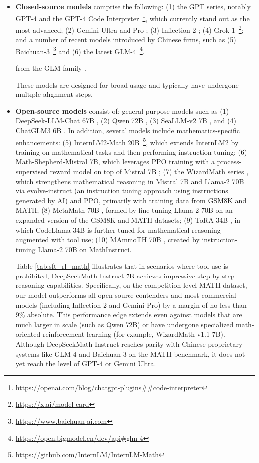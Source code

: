 \begin{itemize}[topsep=0pt]
\begin{itemize}[topsep=0pt]
    \item \textbf{Closed-source models} comprise the following: (1) the GPT series, notably GPT-4 \citep{gpt4} and the GPT-4 Code Interpreter~\footnote{\url{https://openai.com/blog/chatgpt-plugins\#\#code-interpreter}}, which currently stand out as the most advanced; (2) Gemini Ultra and Pro \citep{gemini}; (3) Inflection-2 \citep{inflection-2}; (4) Grok-1~\footnote{\url{https://x.ai/model-card}}; and a number of recent models introduced by Chinese firms, such as (5) Baichuan-3~\footnote{\url{https://www.baichuan-ai.com}} and (6) the latest GLM-4~\footnote{\url{https://open.bigmodel.cn/dev/api\#glm-4}}.

    from the GLM family \citep{glm}.

These models are designed for broad usage and typically have undergone multiple alignment steps.  
\item \textbf{Open-source models} consist of: general-purpose models such as (1) DeepSeek-LLM-Chat 67B \citep{deepseek-llm}, (2) Qwen 72B \citep{qwen}, (3) SeaLLM-v2 7B \citep{seallm}, and (4) ChatGLM3 6B \citep{chatglm3}. In addition, several models include mathematics-specific enhancements: (5) InternLM2-Math 20B~\footnote{\url{https://github.com/InternLM/InternLM-Math}}, which extends InternLM2 by training on mathematical tasks and then performing instruction tuning; (6) Math-Shepherd-Mistral 7B, which leverages PPO training \citep{schulman2017proximal} with a process-supervised reward model on top of Mistral 7B \citep{mistral}; (7) the WizardMath series \citep{wizardmath}, which strengthens mathematical reasoning in Mistral 7B and Llama-2 70B \citep{llama2} via evolve-instruct (an instruction tuning approach using instructions generated by AI) and PPO, primarily with training data from GSM8K and MATH; (8) MetaMath 70B \citep{metamath}, formed by fine-tuning Llama-2 70B on an expanded version of the GSM8K and MATH datasets; (9) ToRA 34B \cite{tora}, in which CodeLlama 34B is further tuned for mathematical reasoning augmented with tool use; (10) MAmmoTH 70B \citep{MathInstruct}, created by instruction-tuning Llama-2 70B on MathInstruct.

Table \ref{tab:sft_rl_math} illustrates that in scenarios where tool use is prohibited, DeepSeekMath-Instruct 7B achieves impressive step-by-step reasoning capabilities. Specifically, on the competition-level MATH dataset, our model outperforms all open-source contenders and most commercial models (including Inflection-2 and Gemini Pro) by a margin of no less than 9\% absolute. This performance edge extends even against models that are much larger in scale (such as Qwen 72B) or have undergone specialized math-oriented reinforcement learning (for example, WizardMath-v1.1 7B). Although DeepSeekMath-Instruct reaches parity with Chinese proprietary systems like GLM-4 and Baichuan-3 on the MATH benchmark, it does not yet reach the level of GPT-4 or Gemini Ultra.


\end{itemize}
\end{itemize}
